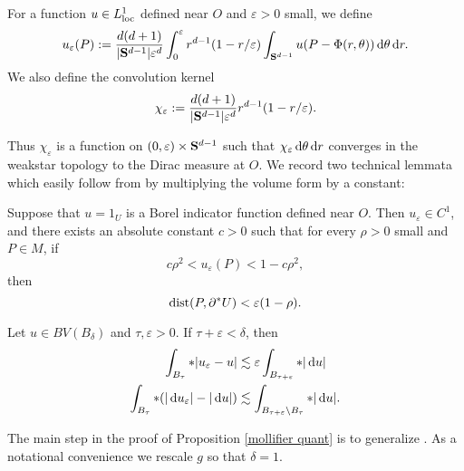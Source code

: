 \begin{definition}
For a function $u \in L^1_{\mathrm{loc}}$ defined near $O$ and $\varepsilon > 0$ small, we define
$$u_\varepsilon(P) := \frac{d(d + 1)}{|\mathbf S^{d - 1}| \varepsilon^d} \int_0^\varepsilon r^{d - 1}(1 - r/\varepsilon) \int_{\mathbf S^{d - 1}} u(P - \Phi(r, \theta)) \mathop{}\!\mathrm{d} \theta \mathop{}\!\mathrm{d} r.$$
We also define the convolution kernel
$$\chi_\varepsilon := \frac{d(d + 1)}{|\mathbf S^{d - 1}| \varepsilon^d}r^{d - 1}(1 - r/\varepsilon).$$
\end{definition}

Thus $\chi_\varepsilon$ is a function on $(0, \varepsilon) \times \mathbf S^{d - 1}$ such that $\chi_\varepsilon \mathop{}\!\mathrm{d} \theta \mathop{}\!\mathrm{d} r$ converges in the weakstar topology to the Dirac measure at $O$.
We record two technical lemmata which easily follow from \cite[Lemmata 7.1--7.2]{Giusti77} by multiplying the volume form by a constant:

\begin{lemma}\label{Giusti71}
Suppose that $u = 1_U$ is a Borel indicator function defined near $O$. Then $u_\varepsilon \in C^1$, and there exists an absolute constant $c > 0$ such that for every $\rho > 0$ small and $P \in M$, if
$$c\rho^2 < u_\varepsilon(P) < 1 - c\rho^2,$$
then
\begin{equation}\label{Giusti71 claim}
\operatorname{dist} (P, \partial^* U) < \varepsilon(1 - \rho).
\end{equation}
\end{lemma}

\begin{lemma}\label{Giusti72}
Let $u \in BV(B_\delta)$ and $\tau, \varepsilon > 0$. If $\tau + \varepsilon < \delta$, then
\begin{align*}
\int_{B_\tau} *|u_\varepsilon - u| &\lesssim \varepsilon \int_{B_{\tau + \varepsilon}} *|\mathop{}\!\mathrm{d} u|\\
\int_{B_\tau} *(|\mathop{}\!\mathrm{d} u_\varepsilon| - |\mathop{}\!\mathrm{d} u|) &\lesssim \int_{B_{\tau + \varepsilon} \setminus B_\tau} *|\mathop{}\!\mathrm{d} u|.
\end{align*}
\end{lemma}

The main step in the proof of Proposition \ref{mollifier quant} is to generalize \cite[Theorem 7.3, Remark 7.4]{Giusti77}.
As a notational convenience we rescale $g$ so that $\delta = 1$.

